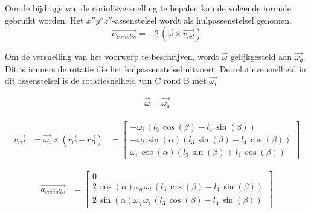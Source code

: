 Om de bijdrage van de coriolisversnelling te bepalen kan de volgende formule gebruikt worden. Het $x''y''z''$-assenstelsel wordt als hulpassenstelsel genomen.
\begin{equation}
\overrightarrow{a_{coriolis}}=-2\,(\overrightarrow{\omega}\times\overrightarrow{v_{rel}})
\end{equation}

Om de versnelling van het voorwerp te beschrijven, wordt $\overrightarrow{\omega}$ gelijkgesteld aan $\overrightarrow{\omega_{g}}$. Dit is immers de rotatie die het hulpassenstelsel uitvoert. De relatieve snelheid in dit assenstelsel is de rotatiesnelheid van C rond B met $\overrightarrow{\omega_{i}}$ 

\begin{equation*}
\begin{split}
\overrightarrow{\omega}=\overrightarrow{\omega_{g}}
\end{split}
\end{equation*}

\begin{equation*}
\begin{split}
\overrightarrow{v_{rel}}&= \overrightarrow{\omega_{i}}\times(\overrightarrow{r_{C}}-\overrightarrow{r_{B}})
&=	\begin{bmatrix}
	-\omega_{i}\, \left( l_{3}\,\cos \left( \beta \right) -l_{4}\,\sin \left( \beta \right)  \right) \\
	-\omega_{i}\,\sin \left( \alpha \right)  \left( l_{3}\,\sin \left( \beta \right) +l_{4}\,\cos \left( \beta \right) \right) \\
	\omega_{i}\,\cos \left( \alpha \right) \left( l_{3}\,\sin \left( \beta \right) +l_{4}\,\cos \left( \beta\right)  \right) \
\end{bmatrix}
\end{split}
\end{equation*}

\begin{equation*}
\begin{split}
\overrightarrow{a_{coriolis}}&=
\begin{bmatrix}
0\\
2\,\cos \left( \alpha\right) \omega_{g}\,\omega_{i}\, \left( l_{3}\,\cos \left( \beta\right) -l_{4}\,\sin \left( \beta \right)  \right) \\
2\,\sin \left( \alpha \right) \omega_{g}\,\omega_{i}\, \left( l_{3}\,\cos \left( \beta \right) -l_{4}\,\sin \left( \beta \right)  \right) \
\end{bmatrix}
\end{split}
\end{equation*}